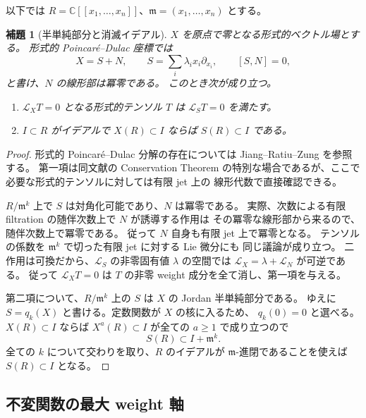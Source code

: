 \documentclass[11pt,a4paper]{ltjsarticle}
\newtheorem{lemma}[theorem]{補題}
\theoremstyle{remark}\newtheorem{remark}[theorem]{注意}
\begin{document}
以下では $R=\mathbb C[[x_1,\ldots,x_n]]$、$\mathfrak m=(x_1,\ldots,x_n)$ とする。

\begin{lemma}[半単純部分と消滅イデアル]
\label{lem:formal-semisimple-fixed}
$X$ を原点で零となる形式的ベクトル場とする。
形式的 Poincar\'e--Dulac 座標では
\[
 X=S+N,\qquad
 S=\sum_i\lambda_i x_i\partial_{x_i},\qquad [S,N]=0,
\]
と書け、$N$ の線形部は冪零である。
このとき次が成り立つ。
\begin{enumerate}
 \item $\mathcal L_X T=0$ となる形式的テンソル $T$ は
       $\mathcal L_S T=0$ を満たす。
 \item $I\subset R$ がイデアルで $X(R)\subset I$ ならば $S(R)\subset I$ である。
\end{enumerate}
\end{lemma}
\begin{proof}
形式的 Poincar\'e--Dulac 分解の存在については
Jiang--Ratiu--Zung \cite[\S2.1]{JRZFormal} を参照する。
第一項は同文献の Conservation Theorem \cite[Theorem 2.3(i)]{JRZFormal}
の特別な場合であるが、ここで必要な形式的テンソルに対しては有限 jet 上の
線形代数で直接確認できる。

$R/\mathfrak m^k$ 上で $S$ は対角化可能であり、$N$ は冪零である。
実際、次数による有限 filtration の随伴次数上で $N$ が誘導する作用は
その冪零な線形部から来るので、随伴次数上で冪零である。
従って $N$ 自身も有限 jet 上で冪零となる。
テンソルの係数を $\mathfrak m^k$ で切った有限 jet に対する Lie 微分にも
同じ議論が成り立つ。
二作用は可換だから、$\mathcal L_S$ の非零固有値 $\lambda$ の空間では
$\mathcal L_X=\lambda+\mathcal L_N$ が可逆である。
従って $\mathcal L_XT=0$ は $T$ の非零 weight 成分を全て消し、第一項を与える。

第二項について、$R/\mathfrak m^k$ 上の $S$ は $X$ の Jordan 半単純部分である。
ゆえに $S=q_k(X)$ と書ける。定数関数が $X$ の核に入るため、
$q_k(0)=0$ と選べる。
$X(R)\subset I$ ならば $X^a(R)\subset I$ が全ての $a\ge1$ で成り立つので
\[
                         S(R)\subset I+\mathfrak m^k.
\]
全ての $k$ について交わりを取り、$R$ のイデアルが
$\mathfrak m$-進閉であることを使えば $S(R)\subset I$ となる。
\end{proof}

\subsection{不変関数の最大 weight 軸}
\end{document}
